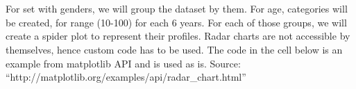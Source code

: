 \documentclass[11pt]{article}
\begin{document}
    \begin{center}
    \end{center}
    { \hspace*{\fill} \\}
    
    \begin{center}
    \end{center}
    { \hspace*{\fill} \\}
    
    For set with genders, we will group the dataset by them. For age,
categories will be created, for range (10-100) for each 6 years. For
each of those groups, we will create a spider plot to represent their
profiles. Radar charts are not accessible by themselves, hence custom
code has to be used. The code in the cell below is an example from
matplotlib API and is used as is. Source:
``http://matplotlib.org/examples/api/radar\_chart.html''
\end{document}
